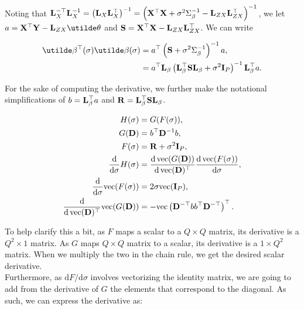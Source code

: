 \documentclass[10pt]{article}
\begin{document}
Noting that ${\bf L}_X^{-\top}{\bf
  L}_X^{-1} = \left({\bf L}_X{\bf L}_X^\top\right)^{-1} = \left({\bf
      X}^\top{\bf X} + \sigma^2\Sigma_\beta^{-1} - {\bf
      L}_{ZX}{\bf L}_{ZX}^\top\right)^{-1}$, we let $a = {\bf X}^\top{\bf Y} - {\bf
  L}_{ZX}\utilde\theta$ and ${\bf S} = {\bf X}^\top{\bf X} - {\bf
  L}_{ZX}{\bf L}_{ZX}^\top$. We can write

\begin{align*}
\utilde\beta^\top(\sigma)\utilde\beta(\sigma) &= a^\top\left({\bf S} +
  \sigma^2\Sigma^{-1}_\beta\right)^{-1}a, \\
& = a^\top{\bf L}_\beta\left({\bf L}_\beta^\top{\bf S}{\bf L}_\beta +
\sigma^2{\bf I}_P\right)^{-1}{\bf L}_\beta^\top a.
\end{align*}

For the sake of computing the derivative, we further make the notational
simplifications of $b = {\bf
  L}_\beta^\top a$ and ${\bf R} = {\bf L}_\beta^\top{\bf S}{\bf L}_\beta$.

\begin{align*}
H(\sigma) & = G(F(\sigma)), \\
G({\bf D}) & = b^\top {\bf D}^{-1} b, \\
F(\sigma) & = {\bf R} + \sigma^2{\bf I}_P, \\
\frac{\mathrm{d}}{\mathrm{d}\sigma}
H(\sigma) & =
\frac{\mathrm{d}\,\mathrm{vec}(G({\bf D}))}{\mathrm{d}\,
  \mathrm{vec}({\bf D})^\top}
\frac{\mathrm{d}\,\mathrm{vec}(F(\sigma))}{\mathrm{d}\sigma}, \\
%
\frac{\mathrm{d}}{\mathrm{d}\sigma}\mathrm{vec}(F(\sigma)) & =
2\sigma\mathrm{vec}({\bf I}_P), \\
%
\frac{\mathrm{d}}{\mathrm{d}\,\mathrm{vec}({\bf D})^\top}
\mathrm{vec}(G({\bf D})) & = -\mathrm{vec}\left({\bf D}^{-\top} b
b^\top {\bf D}^{-\top}\right)^\top.
\end{align*}

To help clarify this a bit, as $F$ maps a scalar to a $Q\times Q$
matrix, its derivative is a $Q^2\times 1$ matrix. As $G$ maps
$Q\times Q$ matrix to a scalar, its derivative is a $1\times Q^2$
matrix. When we multiply the two in the chain rule, we get the desired
scalar derivative. \\

Furthermore, as $\mathrm{d}F/\mathrm{d}\sigma$
involves vectorizing the identity matrix, we are going to add from
the derivative of $G$ the elements that correspond to the diagonal. As
such, we can express the derivative as:
\end{document}
